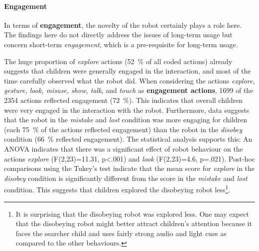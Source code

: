 \documentclass{sig-alternate}
\begin{document}


\paragraph{Engagement}
In terms of \textbf{engagement}, the novelty of the robot certainly plays a role
here. The findings here do not directly address the issues
of long-term usage but concern short-term \textit{engagement}, which is a
pre-requisite for long-term usage.


The huge proportion of \textit{explore} actions (52~\% of all coded actions)
already suggests that children were generally engaged in the interaction, and
most of the time carefully observed what the robot did. When considering the
actions \textit{explore, gesture, look, misuse, show, talk}, and \textit{touch}
as \textbf{engagement actions}, 1699 of the 2354 actions reflected engagement
(72~\%). This indicates that overall children were very engaged in the
interaction with the robot. Furthermore, data suggests that the robot in the
\textit{mistake} and \textit{lost} condition was more engaging for children
(each 75~\% of the actions reflected engagement) than the robot in the
\textit{disobey} condition (66~\% reflected engagement). The statistical
analysis supports this: An ANOVA indicates that there was a significant effect
of robot behaviour on the actions \textit{explore} (F(2,23)=11.31, p<.001) and
\textit{look} (F(2,23)=4.6, p=.021). Post-hoc comparisons using the Tukey's test
indicate that the mean score for \textit{explore} in the \textit{disobey}
condition is significantly different from the score in the \textit{mistake} and
\textit{lost} condition. This suggests that children explored the disobeying
robot less\footnote{It is surprising that the disobeying robot was explored
less. One may expect that the disobeying robot might better attract
children's attention because it faces the searcher child and uses fairly
strong audio and light cues as compared to the other behaviours.}. 
\end{document}
